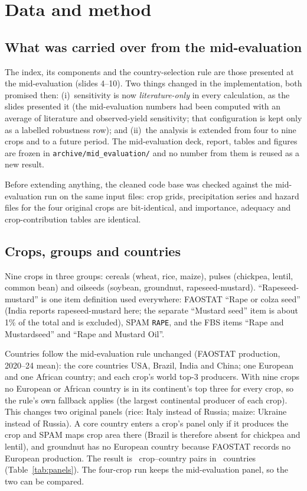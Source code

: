 \section{Data and method}\label{sec:method}

\subsection{What was carried over from the mid-evaluation}
The index, its components and the country-selection rule are those presented at the mid-evaluation
(slides 4--10). Two things changed in the implementation, both promised then:
(i)~sensitivity is now \emph{literature-only} in every calculation, as the slides presented it (the
mid-evaluation numbers had been computed with an average of literature and observed-yield sensitivity;
that configuration is kept only as a labelled robustness row); and (ii)~the analysis is extended from four
to nine crops and to a future period. The mid-evaluation deck, report, tables and figures are frozen in
\texttt{archive/mid\_evaluation/} and no number from them is reused as a new result.

Before extending anything, the cleaned code base was checked against the mid-evaluation run on the
same input files: crop grids, precipitation series and hazard files for the four original crops are
bit-identical, and importance, adequacy and crop-contribution tables are identical.

\subsection{Crops, groups and countries}
Nine crops in three groups: cereals (wheat, rice, maize), pulses (chickpea, lentil, common bean) and
oilseeds (soybean, groundnut, rapeseed-mustard). ``Rapeseed-mustard'' is one item definition used
everywhere: FAOSTAT ``Rape or colza seed'' (India reports rapeseed-mustard here; the separate ``Mustard
seed'' item is about 1\% of the total and is excluded), SPAM \texttt{RAPE}, and the FBS items ``Rape and
Mustardseed'' and ``Rape and Mustard Oil''.

Countries follow the mid-evaluation rule unchanged (FAOSTAT production, 2020--24 mean): the core countries
USA, Brazil, India and China; one European and one African country; and each crop's world top-3
producers. With nine crops no European or African country is in its continent's top three for every crop,
so the rule's own fallback applies (the largest continental producer of each crop). This changes two
original panels (rice: Italy instead of Russia; maize: Ukraine instead of Russia). A core country enters
a crop's panel only if it produces the crop and SPAM maps crop area there (Brazil is therefore absent for
chickpea and lentil), and groundnut has no European country because FAOSTAT records no European
production. The result is \nPairs\ crop--country pairs in \nCountries\ countries
(Table~\ref{tab:panels}). The four-crop run keeps the mid-evaluation panel, so the two can be compared.

